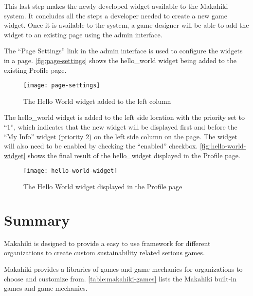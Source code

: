This last step makes the newly developed widget available to the Makahiki system. It concludes all the steps a developer needed to create a new game widget. Once it is available to the system, a game designer will be able to add the widget to an existing page using the admin interface.

The ``Page Settings'' link in the admin interface is used to configure the widgets in a page. \autoref{fig:page-settings} shows the hello\_world widget being added to the existing Profile page.

\begin{figure}[!ht]
  \center
  \texttt{[image: page-settings]}
  \caption{The Hello World widget added to the left column}
  \label{fig:page-settings}
\end{figure}

The hello\_world widget is added to the left side location with the priority set to ``1'', which indicates that the new widget will be displayed first and before the ``My Info'' widget (priority 2) on the left side column on the page.  The widget will also need to be enabled by checking the ``enabled'' checkbox. \autoref{fig:hello-world-widget} shows the final result of the hello\_widget displayed in the Profile page.
\begin{figure}[!ht]
  \center
  \texttt{[image: hello-world-widget]}
  \caption{The Hello World widget displayed in the Profile page}
  \label{fig:hello-world-widget}
\end{figure}

\section{Summary}
Makahiki is designed to provide a easy to use framework for different organizations to create custom sustainability related serious games. 

Makahiki provides a libraries of games and game mechanics for organizations to choose and customize from. \autoref{table:makahiki-games} lists the Makahiki built-in games and game mechanics.

